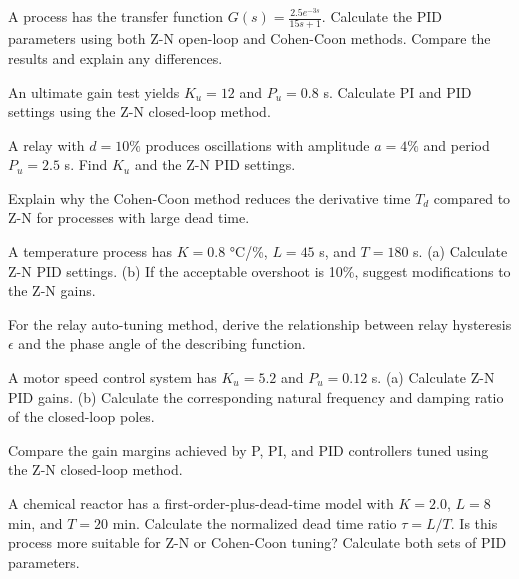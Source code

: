 \begin{exercise}
A process has the transfer function $G(s) = \frac{2.5 e^{-3s}}{15s+1}$. Calculate the PID parameters using both Z-N open-loop and Cohen-Coon methods. Compare the results and explain any differences.
\end{exercise}

\begin{exercise}
An ultimate gain test yields $K_u = 12$ and $P_u = 0.8$ s. Calculate PI and PID settings using the Z-N closed-loop method.
\end{exercise}

\begin{exercise}
A relay with $d = 10\%$ produces oscillations with amplitude $a = 4\%$ and period $P_u = 2.5$ s. Find $K_u$ and the Z-N PID settings.
\end{exercise}

\begin{exercise}
Explain why the Cohen-Coon method reduces the derivative time $T_d$ compared to Z-N for processes with large dead time.
\end{exercise}

\begin{exercise}
A temperature process has $K = 0.8$ °C/\%, $L = 45$ s, and $T = 180$ s. (a) Calculate Z-N PID settings. (b) If the acceptable overshoot is 10\%, suggest modifications to the Z-N gains.
\end{exercise}

\begin{exercise}
For the relay auto-tuning method, derive the relationship between relay hysteresis $\epsilon$ and the phase angle of the describing function.
\end{exercise}

\begin{exercise}
A motor speed control system has $K_u = 5.2$ and $P_u = 0.12$ s. (a) Calculate Z-N PID gains. (b) Calculate the corresponding natural frequency and damping ratio of the closed-loop poles.
\end{exercise}

\begin{exercise}
Compare the gain margins achieved by P, PI, and PID controllers tuned using the Z-N closed-loop method.
\end{exercise}

\begin{exercise}
A chemical reactor has a first-order-plus-dead-time model with $K = 2.0$, $L = 8$ min, and $T = 20$ min. Calculate the normalized dead time ratio $\tau = L/T$. Is this process more suitable for Z-N or Cohen-Coon tuning? Calculate both sets of PID parameters.
\end{exercise}

